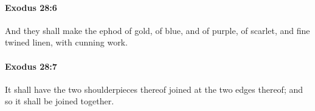 		\paragraph{Exodus 28:6} %
			\label{EXODUS-28-6}

			And they shall make the ephod of gold, of blue, and of purple, of scarlet, and fine twined linen, with cunning work.


		\paragraph{Exodus 28:7} %
			\label{EXODUS-28-7}

			It shall have the two shoulderpieces thereof joined at the two edges thereof; and so it shall be joined together.


